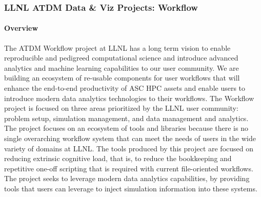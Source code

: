\subsubsection{LLNL ATDM Data \& Viz Projects: Workflow}


\paragraph{Overview} 

The ATDM Workflow project at LLNL has a long term vision to enable reproducible
and pedigreed computational science and introduce advanced analytics and machine
learning capabilities to our user community. We are building an
ecosystem of re-usable components for user workflows that will enhance the
end-to-end productivity of ASC HPC assets and enable users to introduce modern
data analytics technologies to their workflows. The Workflow project is focused
on three areas prioritized by the LLNL user community: problem setup, simulation
management, and data management and analytics. The project focuses on an
ecosystem of tools and libraries because there is no single overarching
workflow system that can meet the needs of users in the wide variety of domains
at LLNL. The tools produced by this project are focused on reducing extrinsic
cognitive load, that is, to reduce the bookkeeping and repetitive one-off
scripting that is required with current file-oriented workflows. The project
seeks to leverage modern data analytics capabilities, by providing tools that
users can leverage to inject simulation information into these systems. 


